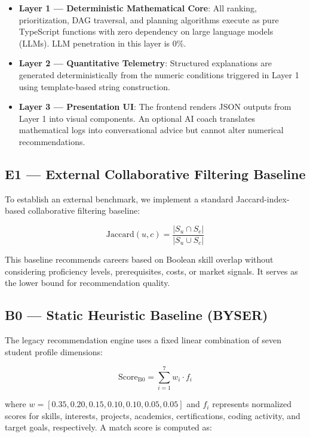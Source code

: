 \documentclass[conference]{IEEEtran}
\begin{document}
\begin{itemize}
    \item \textbf{Layer 1 --- Deterministic Mathematical Core}: All ranking, prioritization, DAG traversal, and planning algorithms execute as pure TypeScript functions with zero dependency on large language models (LLMs). LLM penetration in this layer is 0\%.
    \item \textbf{Layer 2 --- Quantitative Telemetry}: Structured explanations are generated deterministically from the numeric conditions triggered in Layer 1 using template-based string construction.
    \item \textbf{Layer 3 --- Presentation UI}: The frontend renders JSON outputs from Layer 1 into visual components. An optional AI coach translates mathematical logs into conversational advice but cannot alter numerical recommendations.
\end{itemize}

\subsection{E1 --- External Collaborative Filtering Baseline}

To establish an external benchmark, we implement a standard Jaccard-index-based collaborative filtering baseline:

\begin{equation}
\text{Jaccard}(u, c) = \frac{|S_u \cap S_c|}{|S_u \cup S_c|}
\label{eq:jaccard}
\end{equation}

\noindent This baseline recommends careers based on Boolean skill overlap without considering proficiency levels, prerequisites, costs, or market signals. It serves as the lower bound for recommendation quality.

\subsection{B0 --- Static Heuristic Baseline (BYSER)}

The legacy recommendation engine uses a fixed linear combination of seven student profile dimensions:

\begin{equation}
\text{Score}_{\text{B0}} = \sum_{i=1}^{7} w_i \cdot f_i
\label{eq:b0}
\end{equation}

\noindent where $w = [0.35, 0.20, 0.15, 0.10, 0.10, 0.05, 0.05]$ and $f_i$ represents normalized scores for skills, interests, projects, academics, certifications, coding activity, and target goals, respectively. A match score is computed as:
\end{document}
